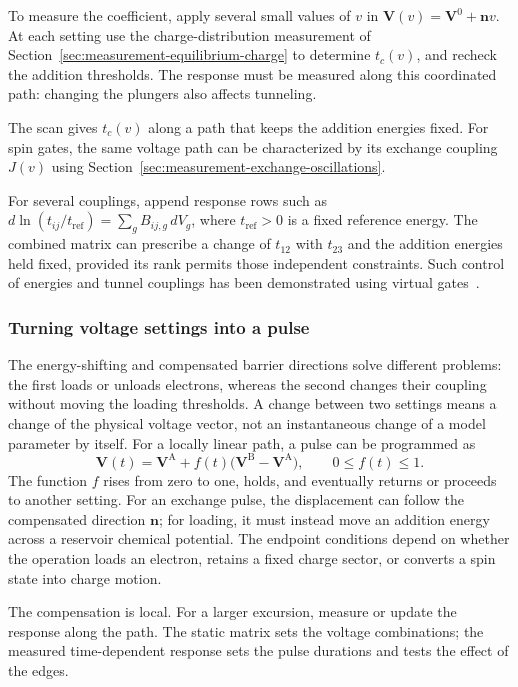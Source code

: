 To measure the coefficient, apply several small values of $v$
in $\mathbf V(v)=\mathbf V^0+\mathbf n v$.
At each setting use the charge-distribution measurement of
Section~\ref{sec:measurement-equilibrium-charge} to determine
$t_c(v)$, and recheck the addition thresholds.
The response must be measured along this coordinated path:
changing the plungers also affects tunneling.

The scan gives $t_c(v)$ along a path that keeps the addition
energies fixed. For spin gates, the same voltage path can be
characterized by its exchange coupling $J(v)$ using
Section~\ref{sec:measurement-exchange-oscillations}.

For several couplings, append response rows such as
$d\ln(t_{ij}/t_{\mathrm{ref}})
=\sum_g B_{ij,g}\,dV_g$, where $t_{\mathrm{ref}}>0$ is a fixed
reference energy. The combined matrix can prescribe a change
of $t_{12}$ with $t_{23}$ and the addition energies held fixed,
provided its rank permits those independent constraints.
Such control of energies and tunnel couplings has been
demonstrated using virtual gates~\cite{Hsiao2020}.

\subsubsection{Turning voltage settings into a pulse}
The energy-shifting and compensated barrier directions solve different
problems: the first loads or unloads electrons, whereas the second
changes their coupling without moving the loading thresholds. A change
between two settings means a change of the physical voltage vector,
not an instantaneous change of a model parameter by itself.
For a locally linear path, a pulse can be programmed as
\[
 \mathbf V(t)=\mathbf V^{\mathrm A}
       +f(t)\bigl(\mathbf V^{\mathrm B}-\mathbf V^{\mathrm A}\bigr),
 \qquad 0\le f(t)\le1.
\]
The function $f$ rises from zero to one, holds, and eventually
returns or proceeds to another setting. For an exchange pulse,
the displacement can follow the compensated direction
$\mathbf n$; for loading, it must instead move an addition energy
across a reservoir chemical potential. The endpoint conditions
depend on whether the operation loads an electron, retains a fixed
charge sector, or converts a spin state into charge motion.

The compensation is local. For a larger excursion, measure or
update the response along the path. The static matrix sets the
voltage combinations; the measured time-dependent response sets
the pulse durations and tests the effect of the edges.
